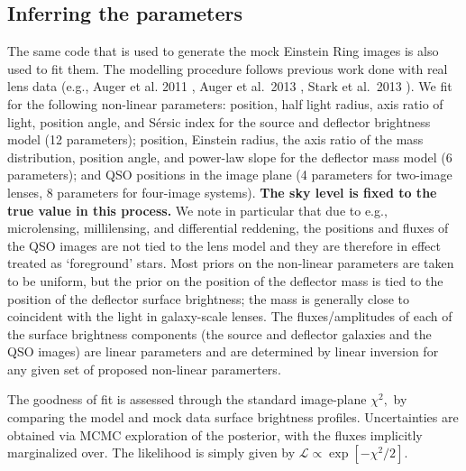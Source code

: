\documentclass[a4paper,11pt]{article}
\begin{document}
\subsection{Inferring the parameters}
\label{ssec:inf}

The same code that is used to generate the mock Einstein Ring images
is also used to fit them. The
modelling procedure follows previous work done with real lens data (e.g., Auger et al. 2011
\cite{2011MNRAS.411L...6A}, Auger et al.~2013 \cite{2013MNRAS.436..503A}, Stark et al.~2013
\cite{2013MNRAS.436.1040S}).
We fit for the following non-linear parameters: position, half light radius, axis
ratio of light, position angle, and S{\'e}rsic index for the
source and deflector brightness model (12 parameters); position, Einstein radius, the
axis ratio of the mass distribution, position angle, and power-law
slope for the deflector mass model (6 parameters); and QSO positions in the image
plane (4 parameters for two-image lenses, 8 parameters for four-image systems). 
{\bf The sky level is fixed to the true value in this process.} We note in particular
that due to e.g., microlensing, millilensing, and differential reddening, the
positions and fluxes of the QSO images are not tied to the lens model and
they are therefore in effect treated as `foreground' stars. Most priors on the non-linear
parameters are taken to be uniform, but the prior on the position of the deflector
mass is tied to the position of the deflector surface brightness;
the mass is generally close to coincident with the light in galaxy-scale lenses.
The fluxes/amplitudes of each of the surface brightness components
(the source and deflector galaxies and the QSO images) are linear parameters and are determined
by linear inversion for any given set of proposed non-linear paramerters.


The goodness of fit is assessed through the standard
image-plane $\chi^{2},$ by comparing the model and mock data surface
brightness profiles.  Uncertainties are obtained via MCMC exploration
of the posterior, with the fluxes implicitly marginalized over. The likelihood is simply given by
$\mathcal{L}\propto\exp[-\chi^{2}/2]$.
%
%
\end{document}
